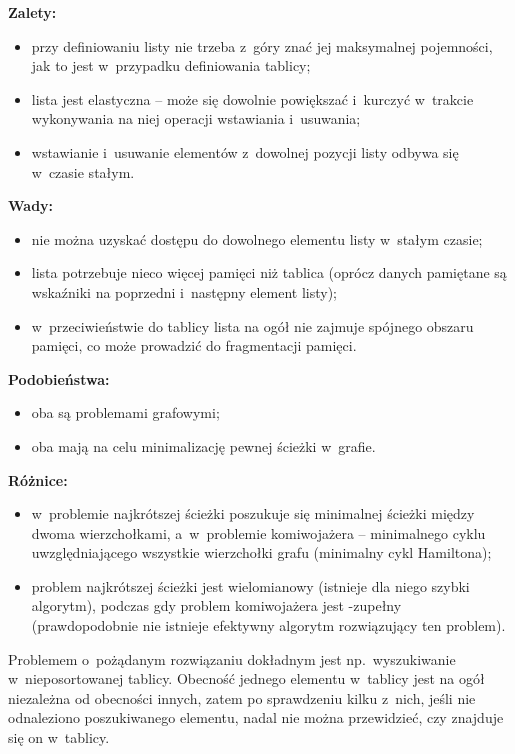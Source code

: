 \bigskip
\noindent\textbf{Zalety:}
\begin{itemize}
	\item przy definiowaniu listy nie trzeba z~góry znać jej maksymalnej pojemności, jak to jest w~przypadku definiowania tablicy;
	\item lista jest elastyczna -- może się dowolnie powiększać i~kurczyć w~trakcie wykonywania na niej operacji wstawiania i~usuwania;
	\item wstawianie i~usuwanie elementów z~dowolnej pozycji listy odbywa się w~czasie stałym.
\end{itemize}
\textbf{Wady:}
\begin{itemize}
	\item nie można uzyskać dostępu do dowolnego elementu listy w~stałym czasie;
	\item lista potrzebuje nieco więcej pamięci niż tablica (oprócz danych pamiętane są wskaźniki na poprzedni i~następny element listy);
	\item w~przeciwieństwie do tablicy lista na ogół nie zajmuje spójnego obszaru pamięci, co może prowadzić do fragmentacji pamięci.
\end{itemize}

\exercise %
\noindent\textbf{Podobieństwa:}
\begin{itemize}
	\item oba są problemami grafowymi;
	\item oba mają na celu minimalizację pewnej ścieżki w~grafie.
\end{itemize}
\textbf{Różnice:}
\begin{itemize}
	\item w~problemie najkrótszej ścieżki poszukuje się minimalnej ścieżki między dwoma wierzchołkami, a~w~problemie komiwojażera -- minimalnego cyklu uwzględniającego wszystkie wierzchołki grafu (minimalny cykl Hamiltona);
	\item problem najkrótszej ścieżki jest wielomianowy (istnieje dla niego szybki algorytm), podczas gdy problem komiwojażera jest \NPclass-zupełny (prawdopodobnie nie istnieje efektywny algorytm rozwiązujący ten problem).
\end{itemize}

\exercise %
Problemem o~pożądanym rozwiązaniu dokładnym jest np.\ wyszukiwanie w~nieposortowanej tablicy. Obecność jednego elementu w~tablicy jest na ogół niezależna od obecności innych, zatem po sprawdzeniu kilku z~nich, jeśli nie odnaleziono poszukiwanego elementu, nadal nie można przewidzieć, czy znajduje się on w~tablicy.

